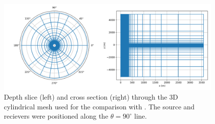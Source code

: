 \begin{figure}
    \begin{center}
    \includegraphics[width=\columnwidth]{figures/commer_mesh.png}
    \end{center}
\caption{Depth slice (left) and cross section (right) through the 3D cylindrical mesh used for the comparison with \cite{Commer2015}. The source and recievers were positioned along the $\theta = 90^\circ$ line.}
\label{fig:commer_mesh}
\end{figure}
